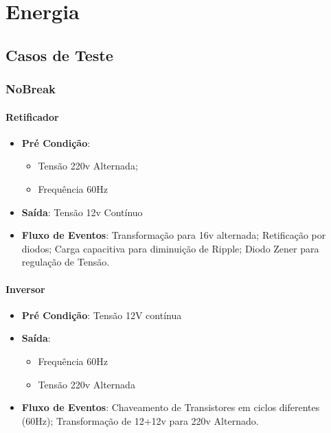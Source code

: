 \chapter[Energia]{Energia}
    \section[Casos de Teste]{Casos de Teste}
        \subsection[NoBreak]{NoBreak}
            \subsubsection[Retificador]{Retificador}
                \begin{itemize}
                    \item \textbf{Pré Condição}:
                        \begin{itemize}
                            \item Tensão 220v Alternada;
                            \item Frequência 60Hz
                        \end{itemize}
                    \item \textbf{Saída}: Tensão 12v Contínuo
                    \item \textbf{Fluxo de Eventos}: Transformação para 16v alternada; 
                        Retificação por diodos; Carga capacitiva para diminuição de
                        Ripple; Diodo Zener para regulação de Tensão.
                \end{itemize}

            \subsubsection[Inversor]{Inversor}
                \begin{itemize}
                    \item \textbf{Pré Condição}: Tensão 12V contínua
                    \item \textbf{Saída}: 
                        \begin{itemize}
                            \item Frequência 60Hz
                            \item Tensão 220v Alternada
                        \end{itemize}
                    \item \textbf{Fluxo de Eventos}: Chaveamento  de Transistores em ciclos 
                        diferentes (60Hz); Transformação de 12+12v para 220v Alternado.
                \end{itemize}

